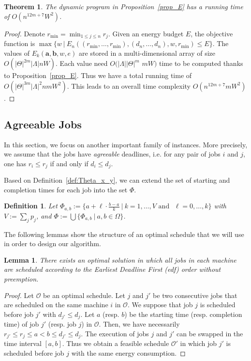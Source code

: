 \documentclass[11pt,a4paper]{article}
\newtheorem{theorem}{Theorem}
\newtheorem{lemma}{Lemma}
\newtheorem{definition}{Definition}
\newcommand{\vecteur}[1]{\ensuremath{\mathbf{#1}}}
\begin{document}
\begin{theorem}\label{prop_complexity_non_preempt}
The dynamic program in Proposition~\ref{prop_E} has a running time of $O(n^{12m+7}W^2)$.
\end{theorem}


\begin{proof}
Denote $r_{\min} = \min_{1 \leq j \leq n} r_{j}$.
Given an energy budget $E$, the objective function is
$\max \{ w~|~E_n((r_{\min},\ldots,r_{\min}),(d_{n},\ldots,d_n),w,r_{\min}) \le E \}$.
The values of $E_k(\vecteur{a},\vecteur{b},w,e)$ are stored in a multi-dimensional array of
size $O(|\Theta|^{2m} |\Lambda| nW)$.
Each value need $O(|\Lambda| |\Theta|^{m}$ $mW)$ time to be computed thanks to Proposition~\ref{prop_E}.
Thus we have a total running time of $O(|\Theta|^{3m} |\Lambda|^2 nmW^2)$.
This leads to an overall time complexity $O(n^{12m+7}mW^2)$.
\end{proof}




\subsection{Agreeable Jobs}

In this section, we focus on another important family of instances. More precisely,
we assume that the jobs have {\em agreeable} deadlines,
i.e.  for any pair of jobs $i$ and $j$, one has $r_i\leq r_j$ if and only if
$d_i\leq d_j$.

Based on Definition~\ref{def:Theta_x_y}, we can extend the set of starting and completion times
for each job into the set $\Phi$.
\begin{definition}\label{def:Phi}
Let $\Phi_{a,b} :=\{a+ \ell \cdot \frac{b-a}{k}~|~ k = 1,\ldots ,V \mbox{ and } $
$\ell = 0,\ldots ,k
\}$ with $V:=\sum_j p_j$, and $\Phi:=\bigcup\{\Phi_{a,b}~|~a,b\in\Omega\}$.
\end{definition}


The following lemmas show the structure of an optimal schedule that we will use in order to design our algorithm.


\begin{lemma}\label{agreeable}
There exists an optimal solution in which all jobs in each machine are
scheduled according to the Earliest Deadline First ({\sc edf}) order without preemption.
\end{lemma}

\begin{proof}
Let $\mathcal{O}$ be an optimal schedule.
Let $j$ and $j'$ be two consecutive jobs that are scheduled on the same machine $i$ in $\mathcal{O}$.
We suppose that job $j$ is scheduled before job ${j'}$ with $d_{j'}\le d_j$.
Let $a$ (resp. $b$) be the starting time (resp. completion time)
of job $j'$ (resp. job $j$) in $\mathcal{O}$. Then, we have necessarily $r_{j'}\leq r_j \leq a< b \leq d_{j'}\leq d_j$. The execution of jobs $j$ and $j'$ can be swapped in the time interval 
$[a,b]$.
Thus we obtain a feasible schedule $\mathcal{O}'$ in which job ${j'}$ is scheduled before job
$j$ with the same energy consumption.
\end{proof}
\end{document}
